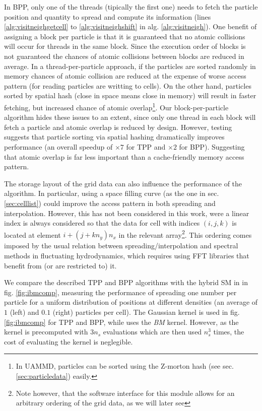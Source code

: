 \documentclass[ twoside,openright,titlepage,numbers=noenddot,%
headinclude,footinclude,cleardoublepage=empty,abstract=on,
BCOR=5mm,paper=a4,fontsize=11pt, dvipsnames
]{scrreprt}
\newcommand{\uammd}{\gls{UAMMD}\xspace}
\begin{document}
In BPP, only one of the threads (tipically the first one) needs to fetch the particle position and quantity to spread and compute its information (lines \ref{alg:visitneighgetcell} to \ref{alg:visitneighshift} in alg. \ref{alg:visitneigh}).
One benefit of assigning a block per particle is that it is guaranteed that no atomic collisions will occur for threads in the same block. Since the execution order of blocks is not guaranteed the chances of atomic collisions between blocks are reduced in average.
In a thread-per-particle approach, if the particles are sorted randomly in memory chances of atomic collision are reduced at the expense of worse access pattern (for reading particles are writting to cells). On the other hand, particles sorted by spatial hash (close in space means close in memory) will result in faster fetching, but increased chance of atomic overlap\footnote{In \uammd, particles can be sorted using the Z-morton hash (see sec. \ref{sec:particledata}) easily.}.
Our block-per-particle algorithm hides these issues to an extent, since only one thread in each block will fetch a particle and atomic overlap is reduced by design.
However, testing suggests that particle sorting via spatial hashing dramatically improves performance (an overall speedup of $\times 7$ for TPP and $\times 2$ for BPP). Suggesting that atomic overlap is far less important than a cache-friendly memory access pattern.

The storage layout of the grid data can also influence the performance of the algorithm. In particular, using a space filling curve (as the one in sec. \ref{sec:celllist}) could improve the access pattern in both spreading and interpolation\cite{Shih2021}. However, this has not been considered in this work, were a linear index is always considered so that the data for cell with indices $(i,j,k)$ is located at element $i+(j+kn_y)n_x$ in the relevant array\footnote{Note however, that the software interface for this module allows for an arbitrary ordering of the grid data, as we will later see}. This ordering comes imposed by the usual relation between spreading/interpolation and spectral methods in fluctuating hydrodynamics, which requires using \gls{FFT} libraries that benefit from (or are restricted to) it.

We compare the described TPP and BPP algorithms with the hybrid SM in \cite{Shih2021} in fig. \ref{fig:ibmcomp}, measuring the performance of spreading one number per particle for a uniform distribution of positions at different densities (an average of $1$ (left) and $0.1$ (right) particles per cell). The Gaussian kernel is used in fig. \ref{fig:ibmcomp} for TPP and BPP, while \cite{Shih2021} uses the \emph{BM} kernel. However, as the kernel is precomputed with $3n_s$ evaluations which are then used $n_s^3$ times, the cost of evaluating the kernel is neglegible.
\end{document}
